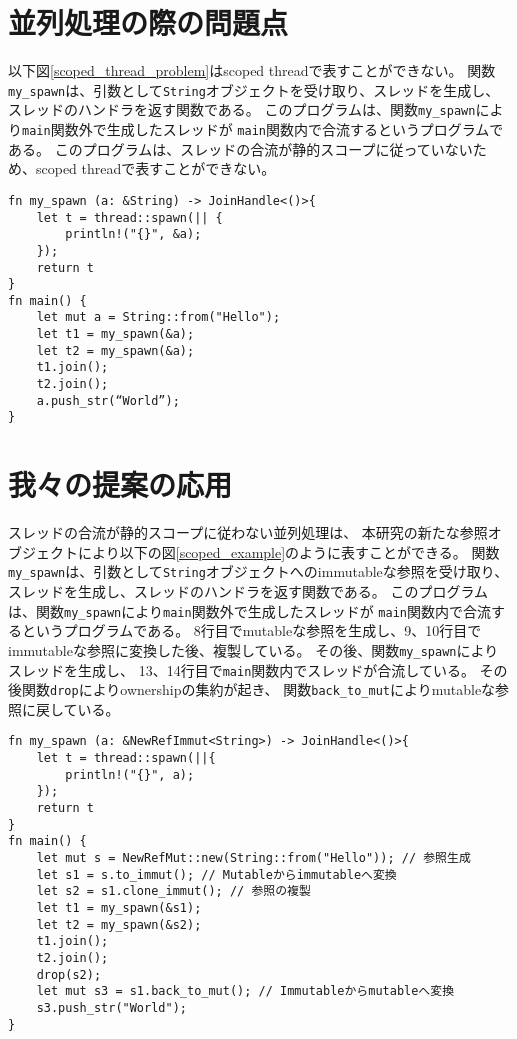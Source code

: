 \documentclass{sumiilab-paper}
\theoremstyle{mystyle}
\numberwithin{definition}{chapter} %
\begin{document}
\section{並列処理の際の問題点}
以下図\ref{scoped_thread_problem}はscoped threadで表すことができない。
関数\texttt{my\_spawn}は、引数として\texttt{String}オブジェクトを受け取り、スレッドを生成し、
スレッドのハンドラを返す関数である。
このプログラムは、関数\texttt{my\_spawn}により\texttt{main}関数外で生成したスレッドが
\texttt{main}関数内で合流するというプログラムである。
このプログラムは、スレッドの合流が静的スコープに従っていないため、scoped threadで表すことができない。
\begin{lstlisting}[caption=scoped threadで表せない例, 
  label=scoped_thread_problem, captionpos=b]
fn my_spawn (a: &String) -> JoinHandle<()>{
    let t = thread::spawn(|| {
        println!("{}", &a);
    });
    return t
}
fn main() {
    let mut a = String::from("Hello");
    let t1 = my_spawn(&a);
    let t2 = my_spawn(&a);
    t1.join();
    t2.join();
    a.push_str(“World”);
}
\end{lstlisting}

\section{我々の提案の応用}
スレッドの合流が静的スコープに従わない並列処理は、
本研究の新たな参照オブジェクトにより以下の図\ref{scoped_example}のように表すことができる。
関数\texttt{my\_spawn}は、引数として\texttt{String}オブジェクトへのimmutableな参照を受け取り、
スレッドを生成し、スレッドのハンドラを返す関数である。
このプログラムは、関数\texttt{my\_spawn}により\texttt{main}関数外で生成したスレッドが
\texttt{main}関数内で合流するというプログラムである。
8行目でmutableな参照を生成し、9、10行目でimmutableな参照に変換した後、複製している。
その後、関数\texttt{my\_spawn}によりスレッドを生成し、
13、14行目で\texttt{main}関数内でスレッドが合流している。
その後関数\texttt{drop}によりownershipの集約が起き、
関数\texttt{back\_to\_mut}によりmutableな参照に戻している。
\begin{lstlisting}[caption=新たな参照オブジェクトを用いた並列処理の例, 
  label=scoped_example, captionpos=b]
fn my_spawn (a: &NewRefImmut<String>) -> JoinHandle<()>{
    let t = thread::spawn(||{
        println!("{}", a);
    });
    return t
}
fn main() {
    let mut s = NewRefMut::new(String::from("Hello")); // 参照生成
    let s1 = s.to_immut(); // Mutableからimmutableへ変換
    let s2 = s1.clone_immut(); // 参照の複製
    let t1 = my_spawn(&s1);
    let t2 = my_spawn(&s2); 
    t1.join();
    t2.join();
    drop(s2);
    let mut s3 = s1.back_to_mut(); // Immutableからmutableへ変換
    s3.push_str("World");
}
\end{lstlisting}
\end{document}
